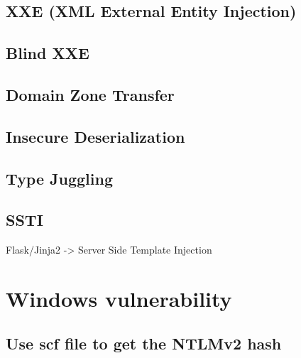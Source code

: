 \documentclass{assets/ipesethesis}
\begin{document}
\hypertarget{xxe-xml-external-entity-injection}{%
\section*{XXE (XML External Entity Injection)}\label{xxe-xml-external-entity-injection}}

\hypertarget{blind-xxe}{%
\section*{Blind XXE}\label{blind-xxe}}

\hypertarget{domain-zone-transfer}{%
\section*{Domain Zone Transfer}\label{domain-zone-transfer}}

\hypertarget{insecure-deserialization}{%
\section*{Insecure Deserialization}\label{insecure-deserialization}}

\hypertarget{type-juggling}{%
\section*{Type Juggling}\label{type-juggling}}

\hypertarget{ssti}{%
\section*{SSTI}\label{ssti}}

Flask/Jinja2 -\textgreater{} Server Side Template Injection

\hypertarget{windows-vulnerability}{%
\chapter*{Windows vulnerability}\label{windows-vulnerability}}

\hypertarget{use-scf-file-to-get-the-ntlmv2-hash}{%
\section*{Use scf file to get the NTLMv2 hash}\label{use-scf-file-to-get-the-ntlmv2-hash}}
\end{document}
